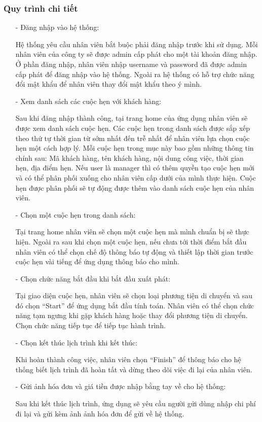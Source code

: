 \documentclass[a4paper]{article}
\begin{document}
\subsubsection{Quy trình chi tiết}
\begin{itemize}    
    \item[-] Đăng nhập vào hệ thống: \par
    Hệ thống yêu cầu nhân viên bắt buộc phải đăng nhập trước khi sử dụng. Mỗi nhân viên của công ty sẽ được admin cấp phát cho một tài khoản đăng nhập. Ở phần đăng nhập, nhân viên nhập username và password đã được admin cấp phát để đăng nhập vào hệ thống. Ngoài ra hệ thống có hỗ trợ chức năng đổi mật khẩu để nhân viên thay đổi mật khẩu theo ý mình.
    \item[-] Xem danh sách các cuộc hẹn với khách hàng: \par
    Sau khi đăng nhập thành công, tại trang home của ứng dụng nhân viên sẽ được xem danh sách cuộc hẹn. Các cuộc hẹn trong danh sách được sắp xếp theo thứ tự thời gian từ sớm nhất đến trễ nhất để nhân viên lựa chọn cuộc hẹn một cách hợp lý. Mỗi cuộc hẹn trong mục này bao gồm những thông tin chính sau: Mã khách hàng, tên khách hàng, nội dung công việc, thời gian hẹn, địa điểm hẹn. Nếu user là manager thì có thêm quyền tạo cuộc hẹn mới và có thể phân phối xuống cho nhân viên cấp dưới của mình thực hiện. Cuộc hẹn được phân phối sẽ tự động được thêm vào danh sách cuộc hẹn của nhân viên.
    \item[-] Chọn một cuộc hẹn trong danh sách:\par
    Tại trang home nhân viên sẽ chọn một cuộc hẹn mà mình chuẩn bị sẽ thực hiện. Ngoài ra sau khi chọn một cuộc hẹn, nếu chưa tới thời điểm bắt đầu nhân viên có thể chọn chế độ thông báo tự động và thiết lập thời gian trước cuộc hẹn vài tiếng để ứng dụng thông báo cho mình.
    \item[-]Chọn chức năng bắt đầu khi bắt đầu xuất phát:\par
    Tại giao diện cuộc hẹn, nhân viên sẽ chọn loại phương tiện di chuyển và sau đó chọn “Start” để ứng dụng bắt đầu tính toán.  Nhân viên có thể chọn chức năng tạm ngưng khi gặp khách hàng hoặc thay đổi phương tiện di chuyển. Chọn chức năng tiếp tục để tiếp tục hành trình.
    \item[-] Chọn kết thúc lịch trình khi kết thúc:\par
    Khi hoàn thành công việc, nhân viên chọn “Finish” để thông báo cho hệ thống biết lịch trình đã hoàn tất và dừng theo dõi việc đi lại của nhân viên.
    \item[-] Gửi ảnh hóa đơn và giá tiền được nhập bằng tay về cho hệ thống:\par
    Sau khi kết thúc lịch trình, ứng dụng sẽ yêu cầu người gửi dùng nhập chi phí đi lại và gửi kèm ảnh ảnh hóa đơn để gửi về hệ thống.
\end{itemize}
\end{document}
